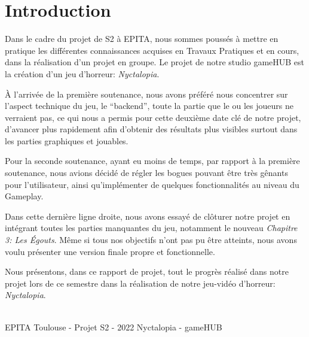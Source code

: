\section{Introduction}
\setlength{\parindent}{5ex}
Dans le cadre du projet de S2 à EPITA, nous sommes poussés à mettre en pratique les différentes connaissances acquises en Travaux Pratiques et en cours, dans la réalisation d'un projet en groupe.
Le projet de notre studio gameHUB est la création d'un jeu d'horreur: \emph{Nyctalopia}.


À l'arrivée de la première soutenance, nous avons préféré nous concentrer sur l'aspect technique du jeu, le ``backend'', toute la partie que le ou les joueurs ne verraient pas, ce qui nous a permis pour cette deuxième date clé de notre projet, d'avancer plus rapidement afin d'obtenir des résultats plus visibles surtout dans les parties graphiques et jouables.

Pour la seconde soutenance, ayant eu moins de temps, par rapport à la première soutenance, nous avions décidé de régler les bogues pouvant être très gênants pour l'utilisateur, ainsi qu'implémenter de quelques fonctionnalités au niveau du Gameplay.

Dans cette dernière ligne droite, nous avons essayé de clôturer notre projet en intégrant toutes les parties manquantes du jeu, notamment le nouveau \emph{Chapitre 3: Les Égouts}. Même si tous nos objectifs n'ont pas pu être atteints, nous avons voulu présenter une version finale propre et fonctionnelle.

Nous présentons, dans ce rapport de projet, tout le progrès réalisé dans notre projet lors de ce semestre dans la réalisation de notre jeu-vidéo d'horreur: \emph{Nyctalopia}.

\vfill
\noindent\makebox[\linewidth]{\rule{.8\paperwidth}{.6pt}}\\[0.2cm]
EPITA Toulouse - Projet S2 - 2022 \hfill Nyctalopia - gameHUB
\noindent\makebox[\linewidth]{\rule{.8\paperwidth}{.6pt}}

\newpage